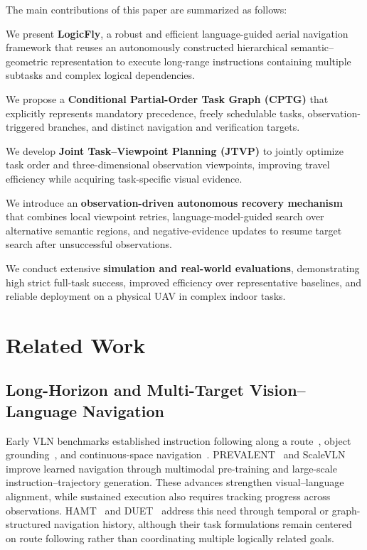 \documentclass[letterpaper,10pt,journal]{IEEEtran}
\begin{document}
The main contributions of this paper are summarized as follows:
\begin{IEEEenumerate}[\setlength{\topsep}{0pt}\setlength{\itemsep}{0pt}]
\item We present \textbf{LogicFly}, a robust and efficient language-guided aerial navigation framework that reuses an autonomously constructed hierarchical semantic--geometric representation to execute long-range instructions containing multiple subtasks and complex logical dependencies.
\item We propose a \textbf{Conditional Partial-Order Task Graph (CPTG)} that explicitly represents mandatory precedence, freely schedulable tasks, observation-triggered branches, and distinct navigation and verification targets.
\item We develop \textbf{Joint Task--Viewpoint Planning (JTVP)} to jointly optimize task order and three-dimensional observation viewpoints, improving travel efficiency while acquiring task-specific visual evidence.
\item We introduce an \textbf{observation-driven autonomous recovery mechanism} that combines local viewpoint retries, language-model-guided search over alternative semantic regions, and negative-evidence updates to resume target search after unsuccessful observations.
\item We conduct extensive \textbf{simulation and real-world evaluations}, demonstrating high strict full-task success, improved efficiency over representative baselines, and reliable deployment on a physical UAV in complex indoor tasks.
\end{IEEEenumerate}



\section{Related Work}
\subsection{Long-Horizon and Multi-Target Vision--Language Navigation}

Early VLN benchmarks established instruction following along a route~\cite{anderson2018r2r,ku2020rxr}, object grounding~\cite{qi2020reverie,zhu2021soon}, and continuous-space navigation~\cite{krantz2020vlnce}. PREVALENT~\cite{hao2020prevalent} and ScaleVLN~\cite{wang2023scalevln} improve learned navigation through multimodal pre-training and large-scale instruction--trajectory generation. These advances strengthen visual--language alignment, while sustained execution also requires tracking progress across observations. HAMT~\cite{chen2021hamt} and DUET~\cite{chen2022duet} address this need through temporal or graph-structured navigation history, although their task formulations remain centered on route following rather than coordinating multiple logically related goals.
\end{document}
